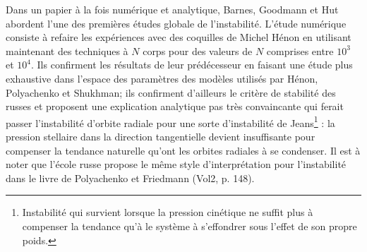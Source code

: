 Dans un papier \`{a} la fois num\'{e}rique et analytique, Barnes, Goodmann et
Hut \cite{barneshut} abordent l'une des premi\`{e}res \'{e}tudes globale de
l'instabilit\'{e}. L'\'{e}tude num\'{e}rique consiste \`{a} refaire les
exp\'{e}riences avec des coquilles de Michel H\'{e}non en utilisant maintenant
des techniques \`{a} $N$ corps pour des valeurs de $N$ comprises entre
$10^{3}$ et $10^{4}$. Ils confirment les r\'{e}sultats de leur
pr\'{e}d\'{e}cesseur en faisant une \'{e}tude plus exhaustive dans l'espace
des param\`{e}tres des modèles utilisés par Hénon, Polyachenko et
Shukhman;  ils confirment d'ailleurs
le crit\`{e}re de stabilit\'{e} des russes et proposent une explication
analytique pas tr\`{e}s convaincante qui ferait passer l'instabilit\'{e} d'orbite radiale pour une sorte d'instabilit\'{e} de
Jeans\footnote{Instabilit\'{e} qui survient lorsque la pression cin\'{e}tique
ne suffit plus \`{a} compenser la tendance qu'\`{a} le syst\`{e}me \`{a}
s'effondrer sous l'effet de son propre poids.} : la pression stellaire dans la
direction tangentielle devient insuffisante pour compenser la tendance
naturelle qu'ont les orbites radiales \`{a} se condenser. Il est à noter que
l'\'{e}cole russe propose le m\^{e}me style d'interpr\'{e}tation pour
l'instabilit\'{e} dans le livre de Polyachenko et Friedmann (Vol2, p. 148).

